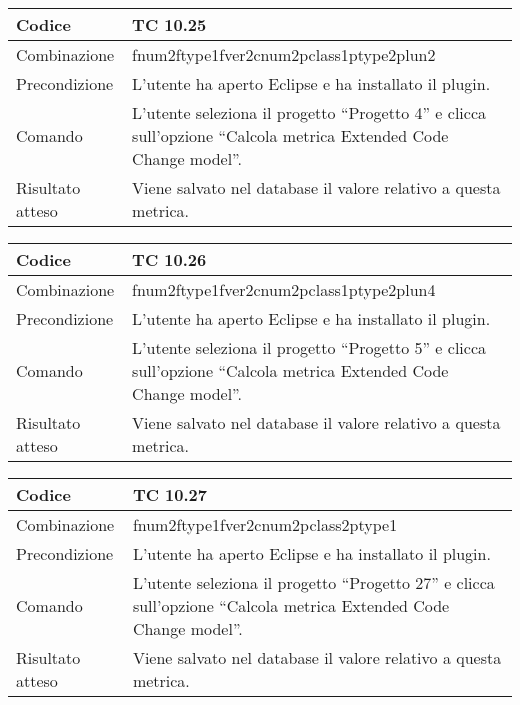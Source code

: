 \begin{table}[ht]
\begin{tabular}{|p{3cm}|p{9cm}|}
\hline
\cellcolor{lightgray}Codice				& TC 10.25								\\
\hline
\cellcolor{lightgray}Combinazione		& fnum2ftype1fver2cnum2pclass1ptype2plun2									\\
\hline
\cellcolor{lightgray}Precondizione		& L'utente ha aperto Eclipse e ha installato il plugin.		\\
\hline
\cellcolor{lightgray}Comando			& L'utente seleziona il progetto ``Progetto 4''  e clicca sull'opzione ``Calcola metrica Extended Code Change model''.	\\
\hline
\cellcolor{lightgray}Risultato atteso	& Viene salvato nel database il valore relativo a questa metrica.\\
\hline
\end{tabular}
\end{table}


\begin{table}[ht]
\begin{tabular}{|p{3cm}|p{9cm}|}
\hline
\cellcolor{lightgray}Codice				& TC 10.26								\\
\hline
\cellcolor{lightgray}Combinazione		& fnum2ftype1fver2cnum2pclass1ptype2plun4									\\
\hline
\cellcolor{lightgray}Precondizione		& L'utente ha aperto Eclipse e ha installato il plugin.		\\
\hline
\cellcolor{lightgray}Comando			& L'utente seleziona il progetto ``Progetto 5''  e clicca sull'opzione ``Calcola metrica Extended Code Change model''.	\\
\hline
\cellcolor{lightgray}Risultato atteso	& Viene salvato nel database il valore relativo a questa metrica.\\
\hline
\end{tabular}
\end{table}


\begin{table}[ht]
\begin{tabular}{|p{3cm}|p{9cm}|}
\hline
\cellcolor{lightgray}Codice				& TC 10.27								\\
\hline
\cellcolor{lightgray}Combinazione		& fnum2ftype1fver2cnum2pclass2ptype1									\\
\hline
\cellcolor{lightgray}Precondizione		& L'utente ha aperto Eclipse e ha installato il plugin.		\\
\hline
\cellcolor{lightgray}Comando			& L'utente seleziona il progetto ``Progetto 27''  e clicca sull'opzione ``Calcola metrica Extended Code Change model''.	\\
\hline
\cellcolor{lightgray}Risultato atteso	& Viene salvato nel database il valore relativo a questa metrica.\\
\hline
\end{tabular}
\end{table}

